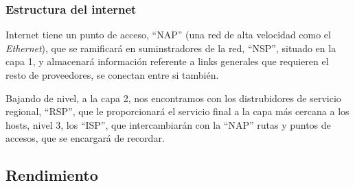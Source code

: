 \subsubsection{Estructura del internet}
\noindent Internet tiene un punto de acceso, ``NAP'' (una red de alta velocidad como el \textit{Ethernet}), que se ramificará en suminstradores de la red, ``NSP'', situado en la capa 1, y almacenará información referente a links generales que requieren el resto de proveedores, se conectan entre si también.\par Bajando de nivel, a la capa 2, nos encontramos con los distrubidores de servicio regional, ``RSP'', que le proporcionará el servicio final a la capa más cercana a los hosts, nivel 3, los ``ISP'', que intercambiarán con la ``NAP'' rutas y puntos de accesos, que se encargará de recordar.
\subsection{Rendimiento}
